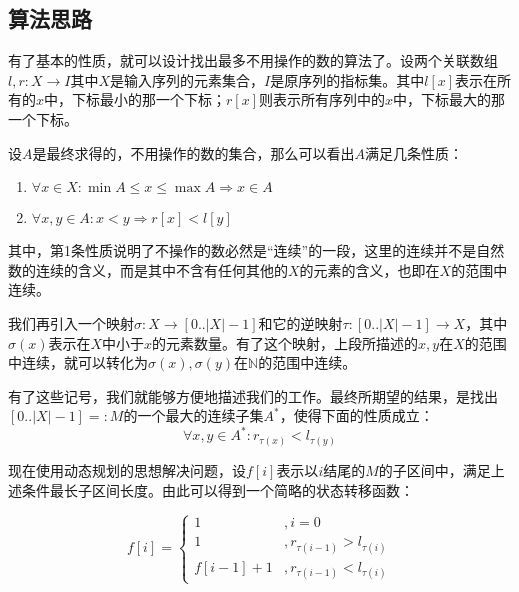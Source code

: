 \documentclass[UTF8]{ctexart}
\begin{document}
    \subsection*{算法思路}
        有了基本的性质，就可以设计找出最多不用操作的数的算法了。设两个关联数组$l, r:X\to I$其中$X$是输入序列的元素集合，$I$是原序列的指标集。其中$l[x]$表示在所有的$x$中，下标最小的那一个下标；$r[x]$则表示所有序列中的$x$中，下标最大的那一个下标。

        设$A$是最终求得的，不用操作的数的集合，那么可以看出$A$满足几条性质：

        \begin{enumerate}
            \item $\forall x\in X: \min{A} \leq x \leq \max{A} \Rightarrow x\in A$
            \item $\forall x, y \in A: x < y \Rightarrow r[x] < l[y]$
        \end{enumerate}

        其中，第1条性质说明了不操作的数必然是``连续''的一段，这里的连续并不是自然数的连续的含义，而是其中不含有任何其他的$X$的元素的含义，也即在$X$的范围中连续。

        我们再引入一个映射$\sigma: X \to [0..|X|-1]$和它的逆映射$\tau: [0..|X|-1] \to X$，其中$\sigma(x)$表示在$X$中小于$x$的元素数量。有了这个映射，上段所描述的$x, y$在$X$的范围中连续，就可以转化为$\sigma(x), \sigma(y)$在$\mathbb{N}$的范围中连续。

        有了这些记号，我们就能够方便地描述我们的工作。最终所期望的结果，是找出$[0..|X|-1]=:M$的一个最大的连续子集$A^*$，使得下面的性质成立：
        $$\forall x, y \in A^*: r_{\tau(x)} < l_{\tau(y)}$$

        现在使用动态规划的思想解决问题，设$f[i]$表示以$i$结尾的$M$的子区间中，满足上述条件最长子区间长度。由此可以得到一个简略的状态转移函数：

        \begin{equation*}
            f[i] = 
            \begin{cases}
                1 &, i=0 \\
                1 &, r_{\tau({i-1})} > l_{\tau({i})} \\
                f[i-1] + 1 &, r_{\tau({i-1})} < l_{\tau({i})}
            \end{cases}
        \end{equation*}
\end{document}
